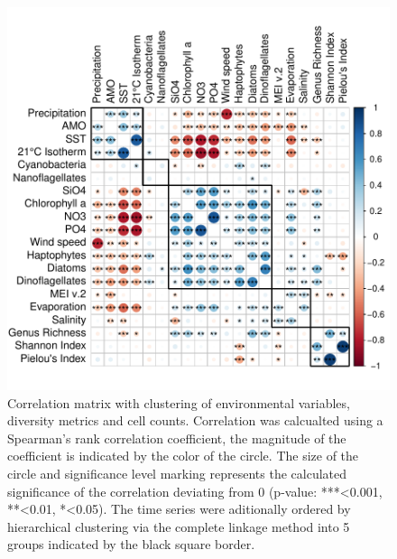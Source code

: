 \documentclass[draft]{agujournal2019}
\begin{document}
\begin{figure}
\noindent\includegraphics[width=\textwidth]{fig/CorrClustSupplementalPlot_v1.pdf}
\caption{Correlation matrix with clustering of environmental variables, diversity metrics and cell counts. Correlation was calcualted using a Spearman's rank correlation coefficient, the magnitude of the coefficient is indicated by the color of the circle. The size of the circle and significance level marking represents the calculated significance of the correlation deviating from 0 (p-value: ***\textless0.001, **\textless0.01, *\textless0.05). The time series were aditionally ordered by hierarchical clustering via the complete linkage method into 5 groups indicated by the black square border.}
\label{fig:map}
\end{figure}
%


\end{document}
